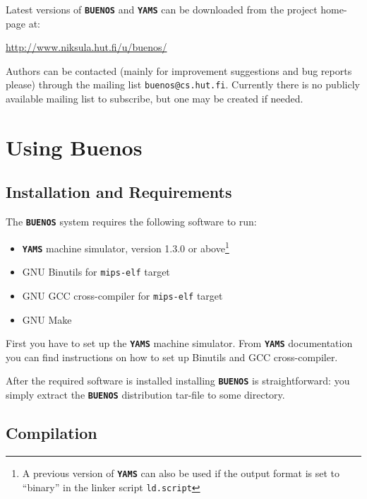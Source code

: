\documentclass[twoside,a4paper]{report}
\newcommand{\buenos}{\texttt{\textbf{BUENOS}}}
\newcommand{\yams}{\texttt{\textbf{YAMS}}}
\begin{document}
Latest versions of \buenos{} and \yams{} can be downloaded from the
project home-page at:

\vspace{\baselineskip}
\url{http://www.niksula.hut.fi/u/buenos/}
\vspace{\baselineskip}

Authors can be contacted (mainly for improvement suggestions and bug
reports please) through the mailing list \texttt{buenos@cs.hut.fi}.
Currently there is no publicly available mailing list to subscribe,
but one may be created if needed.

\chapter{Using Buenos}
\label{sec:usage}

\section{Installation and Requirements}
\label{sec:install}

The \buenos{} system requires the following software to run:
\begin{itemize}
\item \yams{} machine simulator, version 1.3.0 or above\footnote{A
previous version of \yams{} can also be used if the output format is
set to ``binary'' in the linker script \texttt{ld.script}}
\item GNU Binutils for \texttt{mips-elf} target
\item GNU GCC cross-compiler for \texttt{mips-elf} target
\item GNU Make
\end{itemize}

First you have to set up the \yams{} machine simulator. From \yams{}
documentation you can find instructions on how to set up Binutils and
GCC cross-compiler.

After the required software is installed installing \buenos{} is
straightforward: you simply extract the \buenos{} distribution tar-file
to some directory.


\section{Compilation}
\label{sec:compiling}
\end{document}
